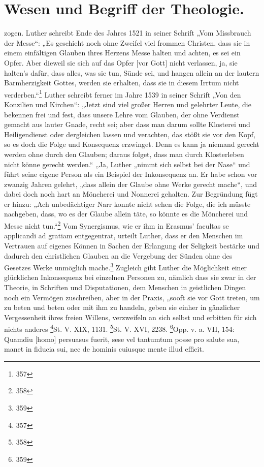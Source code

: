 \section*{Wesen und Begriff der Theologie.}
\setcounter{page}{98}
zogen. Luther schreibt Ende des Jahres 1521 in seiner Schrift „Vom Missbrauch der Messe“: „Es geschieht noch ohne Zweifel viel frommen Christen, dass sie in einem einfältigen Glauben ihres Herzens Messe halten und achten, es sei ein Opfer. Aber dieweil sie sich auf das Opfer [vor Gott] nicht verlassen, ja, sie halten’s dafür, dass alles, was sie tun, Sünde sei, und hangen allein an der lautern Barmherzigkeit Gottes, werden sie erhalten, dass sie in diesem Irrtum nicht verderben.“\footnote{357} Luther schreibt ferner im Jahre 1539 in seiner Schrift „Von den Konzilien und Kirchen“: „Jetzt sind viel großer Herren und gelehrter Leute, die bekennen frei und fest, dass unsere Lehre vom Glauben, der ohne Verdienst gemacht aus lauter Gnade, recht sei; aber dass man darum sollte Klosterei und Heiligendienst oder dergleichen lassen und verachten, das stößt sie vor den Kopf, so es doch die Folge und Konsequenz erzwinget. Denn es kann ja niemand gerecht werden ohne durch den Glauben; daraus folget, dass man durch Klosterleben nicht könne gerecht werden.“ „Ja, Luther „nimmt sich selbst bei der Nase“ und führt seine eigene Person als ein Beispiel der Inkonsequenz an. Er habe schon vor zwanzig Jahren gelehrt, „dass allein der Glaube ohne Werke gerecht mache“, und dabei doch noch hart an Möncherei und Nonnerei gehalten. Zur Begründung fügt er hinzu: „Ach unbedächtiger Narr konnte nicht sehen die Folge, die ich müsste nachgeben, dass, wo es der Glaube allein täte, so könnte es die Möncherei und Messe nicht tun.“\footnote{358} Vom Synergismus, wie er ihm in Erasmus’ facultas se applicandi ad gratiam entgegentrat, urteilt Luther, dass er den Menschen im Vertrauen auf eigenes Können in Sachen der Erlangung der Seligkeit bestärke und dadurch den christlichen Glauben an die Vergebung der Sünden ohne des Gesetzes Werke unmöglich mache.\footnote{359} Zugleich gibt Luther die Möglichkeit einer glücklichen Inkonsequenz bei einzelnen Personen zu, nämlich dass sie zwar in der Theorie, in Schriften und Disputationen, dem Menschen in geistlichen Dingen noch ein Vermögen zuschreiben, aber in der Praxis, „sooft sie vor Gott treten, um zu beten und beten oder mit ihm zu handeln, geben sie einher in gänzlicher Vergessenheit ihres freien Willens, verzweifeln an sich selbst und erbitten für sich nichts anderes
\footnote{357}{St. V. XIX, 1131.}
\footnote{358}{St. V. XVI, 2238.}
\footnote{359}{Opp. v. a. VII, 154: Quamdiu [homo] persuasus fuerit, sese vel tantumtum posse pro salute sua, manet in fiducia sui, nec de hominis cuiusque mente illud efficit.}